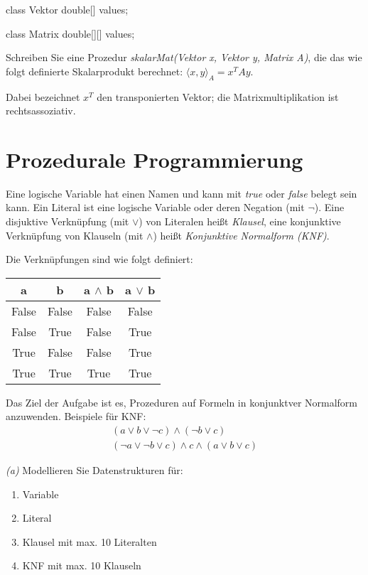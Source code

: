 \documentclass[11pt,a4paper,oneside,ngerman]{scrbook}
\begin{document}
\begin{code}
class Vektor {
  double[] values;
}

class Matrix {
  double[][] values;
}
\end{code}

Schreiben Sie eine Prozedur \emph{skalarMat(Vektor x, Vektor y, Matrix A)}, die das wie folgt definierte Skalarprodukt berechnet: $\langle x, y\rangle_A  =  x^TAy$.

Dabei bezeichnet $x^T$ den transponierten Vektor; die Matrixmultiplikation ist rechtsassoziativ.

\begin{code}
  double skalarMat(Vektor x, Vektor y, Matrix A) {
    
  
\end{code}

\newpage

\section{Prozedurale Programmierung}

Eine logische Variable hat einen Namen und kann mit \emph{true} oder \emph{false} belegt sein kann. Ein Literal ist eine logische Variable oder deren Negation (mit $\neg$). Eine disjuktive Verknüpfung (mit $\lor$) von Literalen heißt \emph{Klausel}, eine konjunktive Verknüpfung von Klauseln (mit $\land$) heißt \emph{Konjunktive Normalform (KNF)}.


Die Verknüpfungen sind wie folgt definiert:


\begin{tabular}[ht]{|c|c|c|c|} %
  \hline
  a & b & a $\land$ b & a $\lor$ b\\
  \hline
  False & False & False & False\\
  False & True & False & True\\
  True & False & False & True\\
  True & True & True & True\\
  \hline
\end{tabular}


Das Ziel der Aufgabe ist es, Prozeduren auf Formeln in konjunktver Normalform anzuwenden. Beispiele für KNF:
\begin{gather*}
  (a \lor b \lor \neg c) \land ( \neg b \lor c) \\
  (\neg a \lor \neg b \lor c ) \land c \land (a \lor b \lor c)
\end{gather*}

\emph{(a)} Modellieren Sie Datenstrukturen für:
\begin{enumerate}
  \item Variable
  \item Literal
  \item Klausel mit max. 10 Literalten
  \item KNF mit max. 10 Klauseln
\end{enumerate}
\end{document}
